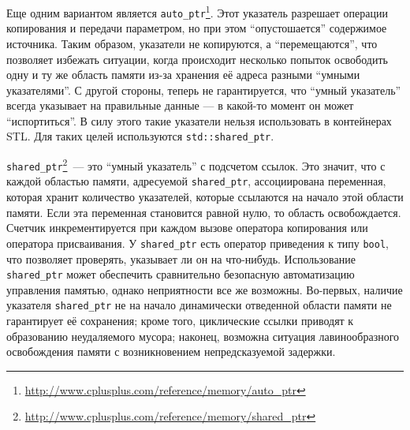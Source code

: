Еще одним вариантом является \lstinline{auto_ptr}\footnote{\url{http://www.cplusplus.com/reference/memory/auto_ptr}}. Этот указатель разрешает
операции копирования и передачи параметром, но при этом ``опустошается'' содержимое источника. Таким образом, указатели не копируются, 
а ``перемещаются'', что позволяет избежать ситуации, когда происходит несколько попыток освободить одну и ту же область памяти из-за хранения 
её адреса разными ``умными указателями''. С другой стороны, теперь не гарантируется, что ``умный указатель'' всегда указывает на правильные данные ---
в какой-то момент он может ``испортиться''. В силу этого такие указатели нельзя использовать в контейнерах STL. Для таких целей используются
\lstinline{std::shared_ptr}.

\lstinline{shared_ptr}\footnote{\url{http://www.cplusplus.com/reference/memory/shared_ptr}}~--- это ``умный указатель'' с подсчетом ссылок. Это значит, 
что с каждой областью памяти, адресуемой \lstinline{shared_ptr}, ассоциирована переменная, которая хранит количество указателей, которые ссылаются на начало
этой области памяти. Если эта переменная становится равной нулю, то область освобождается. Счетчик инкрементируется при каждом вызове оператора копирования 
или оператора присваивания. У \lstinline{shared_ptr} есть оператор приведения к типу \lstinline{bool}, что позволяет проверять, указывает ли он на что-нибудь.
Использование \lstinline{shared_ptr} может обеспечить сравнительно безопасную автоматизацию управления памятью, однако неприятности все же возможны. Во-первых,
наличие указателя \lstinline{shared_ptr} не на начало динамически отведенной области памяти не гарантирует её сохранения; кроме того, циклические
ссылки приводят к образованию неудаляемого мусора; наконец, возможна ситуация лавинообразного освобождения памяти с возникновением непредсказуемой
задержки.

